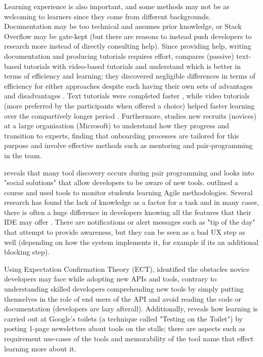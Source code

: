 \documentclass{mprop}
\begin{document}
Learning experience is also important, and some methods may not be as welcoming to learners since they come from different backgrounds. Documentation may be too technical and assumes prior knowledge, or Stack Overflow may be gate-kept \cite{cheriyan2017norm,miller2022did} (but there are reasons to instead push developers to research more instead of directly consulting help). Since providing help, writing documentation and producing tutorials requires effort, \textcite{kafer2017best} compares (passive) text-based tutorials with video-based tutorials and understand which is better in terms of efficiency and learning; they discovered negligible differences in terms of efficiency for either approaches despite each having their own sets of advantages and disadvantages  \cite{alexanderUsabilityPrintOnline2013,devaney2009impact,payneAnimatedDemonstrationsExploratory1992}. Text tutorials were completed faster \cite{mestreStudentPreferenceTutorial2012}, while video tutorials (more preferred by the participants when offered a choice) helped faster learning over the compartively longer period \cite{baeckerShowingInsteadTelling2002,lloydScreencastTutorialsEnhance2012,vandermeijComparisonPaperbasedVideo2014}. Furthermore, \textcite{begelNoviceSoftwareDevelopers2008} studies new recruits (novices) at a large organisation (Microsoft) to understand how they progress and transition to experts, finding that onboarding processes are tailored for this purpose and involve effective methods such as mentoring and pair-programming in the team.

\textcite{cockburnCostsBenefitsPair2001} reveals that many tool discovery occurs during pair programming and \textcite{murphy2011peer,murphy-hillHowUsersDiscover2015} looks into "social solutions" that allow developers to be aware of new tools. \textcite{marzoloExtremeDevelopmentMeans2021} outlined a course and used tools to monitor students learning Agile methodologies. Several research has found the lack of knowledge as a factor for a task \cite{grossmanSurveySoftwareLearnability2009} and in many cases, there is often a huge difference in developers knowing all the features that their IDE may offer \cite{campbellDesigningRefactoringTools2008}. There are notifications or alert messages such as "tip of the day" that attempt to provide awareness, but they can be seen as a bad UX step as well (depending on how the system implements it, for example if its an additional blocking step).

Using Expectation Confirmation Theory (ECT), \textcite{raufPerceivedObstaclesNovice2016} identified the obstacles novice developers may face while adopting new APIs and tools, contrary to \textcite{roehm2012professional} understanding skilled developers comprehending new tools by simply putting themselves in the role of end users of the API and avoid reading the code or documentation (developers are lazy afterall). Additionally, \textcite{murphy2019developers} reveals how learning is carried out at Google's toilets (a technique called "Testing on the Toilet") by posting 1-page newsletters about tools on the stalls; there are aspects such as requirement use-cases of the tools and memorability of the tool name that effect learning more about it.
\end{document}
